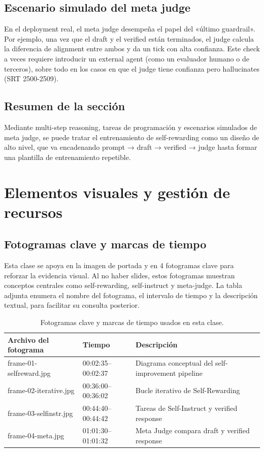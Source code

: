 \documentclass[a4paper]{article}
\begin{document}
\subsection{Escenario simulado del meta judge}
En el deployment real, el meta judge desempeña el papel del «último guardrail». Por ejemplo, una vez que el draft y el verified están terminados, el judge calcula la diferencia de alignment entre ambos y da un tick con alta confianza. Este check a veces requiere introducir un external agent (como un evaluador humano o de terceros), sobre todo en los casos en que el judge tiene confianza pero hallucinates (SRT 2500-2509).

\subsection{Resumen de la sección}
Mediante multi-step reasoning, tareas de programación y escenarios simulados de meta judge, se puede tratar el entrenamiento de self-rewarding como un diseño de alto nivel, que va encadenando prompt → draft → verified → judge hasta formar una plantilla de entrenamiento repetible.

\section{Elementos visuales y gestión de recursos}
\subsection{Fotogramas clave y marcas de tiempo}
Esta clase se apoya en la imagen de portada y en 4 fotogramas clave para reforzar la evidencia visual. Al no haber slides, estos fotogramas muestran conceptos centrales como self-rewarding, self-instruct y meta-judge. La tabla adjunta enumera el nombre del fotograma, el intervalo de tiempo y la descripción textual, para facilitar su consulta posterior.

\begin{table}[H]
\centering
\begin{tabular}{p{3cm}p{3cm}p{7cm}}
\toprule
Archivo del fotograma & Tiempo & Descripción \\
\midrule
frame-01-selfreward.jpg & 00:02:35--00:02:37 & Diagrama conceptual del self-improvement pipeline \\
frame-02-iterative.jpg & 00:36:00--00:36:02 & Bucle iterativo de Self-Rewarding \\
frame-03-selfinstr.jpg & 00:44:40--00:44:42 & Tareas de Self-Instruct y verified response \\
frame-04-meta.jpg & 01:01:30--01:01:32 & Meta Judge compara draft y verified response \\
\bottomrule
\end{tabular}
\caption{Fotogramas clave y marcas de tiempo usados en esta clase.}
\end{table}
\end{document}

